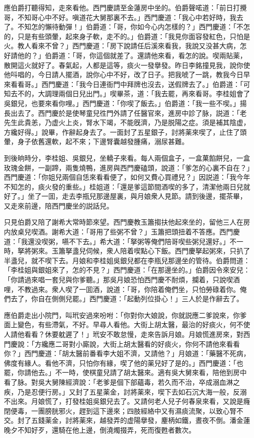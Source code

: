 應伯爵打聽得知，走來看他。西門慶請至金蓮房中坐的。伯爵聲喏道：「前日打攪哥，不知哥心中不好。嗔道花大舅那裏不去。」西門慶道：「我心中若好時，我去了。不知怎的懶待動彈！」伯爵道：「哥，你如今心内怎樣的？」西門慶道：「不怎的，只是有些頭暈，起來身子軟，走不的。」伯爵道：「我見你面容發紅色，只怕是火。教人看來不曾？」西門慶道：「房下說請任后溪來看我，我說又没甚大病，怎好請他的？」伯爵道：「哥，你這個就差了。還請他來看，看怎的說。喫兩貼薬，散開這火就好了。春氣起，人都是這等，痰火一發擧發。昨日李銘撞見我，說你使他呌唱的，今日請人擺酒，說你心中不好，改了日子。把我唬了一跳，教我今日早來看看哥。」西門慶道：「我今日連衙門中拜牌也沒去，送假牌去了。」伯爵道：「可知去不的，大調理兩個日兒出門。」喫畢茶，道：「我去罷，再來看哥。李桂姐會了吳銀兒，也要來看你哩。」西門慶道：「你喫了飯去。」伯爵道：「我一些不喫。」揚長出去了。西門慶於是使琴童兒徃門外請了任醫官來，進房中診了脉，説道：「老先生此貴恙，乃虚火上炎，腎水下竭，不能旣濟，乃是脱陽之症。須是補其陰虚，方纔好得。」說畢，作辭起身去了。一面封了五星銀子，討將薬來喫了，止住了頭暈，身子依舊還軟，起不來；下邊腎囊越發腫痛，溺尿甚難。

到後晌時分，李桂姐、吳銀兒，坐轎子來看。每人兩個盒子，一盒菓餡餅兒，一盒玫瑰金餅，一副蹄，兩隻燒鴨，進房與西門慶磕頭，說道：「爹怎的心裏不自在？」西門慶道：「你姐兒兩個自恁來看看便了，如何又費心買禮兒？」因説道：「我今年不知怎的，痰火發的重些。」桂姐道：「還是爹這節間酒喫的多了，清潔他兩日兒就好了。」坐了一囬，走去李瓶兒那邊屋裏，與月娘衆人見節。請到後邊，擺茶畢，又走來前邊，陪西門慶坐的説話兒。

只見伯爵又陪了謝希大常時節來望。西門慶教玉簫搊扶他起來坐的，留他三人在房内放桌兒喫酒。謝希大道：「哥用了些粥不曾？」玉簫把頭扭着不答應。西門慶道：「我還没喫粥，嚥不下去。」希大道：「拏粥等俺們陪哥喫些粥兒還好。」不一時，拏將粥來。玉簫拏盞兒伺候，衆人陪着喫點心下飯。西門慶拏起粥來，只扒了半盞兒，就不喫下去。月娘和李桂姐吳銀兒都在李瓶兒那邊坐的管待。伯爵問道：「李桂姐與銀姐來了，怎的不見？」西門慶道：「在那邊坐的。」伯爵因令來安兒：「你請過來唱一套兒與你爹聽。」那吳月娘恐怕西門慶不耐煩，攔着，只說喫酒哩，不教過來。衆人喫了一囬酒，說道：「哥，你陪着俺們坐，只怕勞碌着你。俺們去了，你自在側側兒罷。」西門慶道：「起動列位掛心！」三人於是作辭去了。

應伯爵走出小院門，叫玳安過來吩咐：「你對你大娘說，你就説應二爹說來，你爹面上變色，有些滯氣，不好。早尋人看他。大街上胡太醫，最治的好痰火，何不使人請他看看？休要躭遲了！」玳安不敢怠慢，走來告訴月娘。月娘慌進房來，對西門慶說：「方纔應二哥對小廝說，大街上胡太醫看的好痰火，你何不請他來看看你？」西門慶道：「胡太醫前番看李大姐不濟，又請他？」月娘道：「藥醫不死病，佛度有緣人。看他不濟，只怕你有緣，喫了他的薬兒好了是的。」西門慶道：「也罷，你請他去。」不一時，使棋童兒請了胡太醫來。適有吳大舅來看，陪他到房中看了脉。對吳大舅陳經濟說：「老爹是個下部蘊毒，若久而不治，卒成溺血淋之疾，乃是忍便行房。」又封了五星薬金，討將薬來，喫下去如石沉大海一般，反溺不出來。月娘慌了，打發桂姐吳銀兒去了。又請何老人兒子何春泉來看，又說是癃閉便毒，一團膀胱邪火，趕到這下邊來；四肢經絡中又有濕痰流聚，以致心腎不交。封了五錢薬金，討將薬來，越發弄的虚陽擧發，麈柄如鐵，晝夜不倒。潘金蓮晚夕不知好歹，還騎在他上邊，倒澆燭掇弄，死而復甦者數次。

